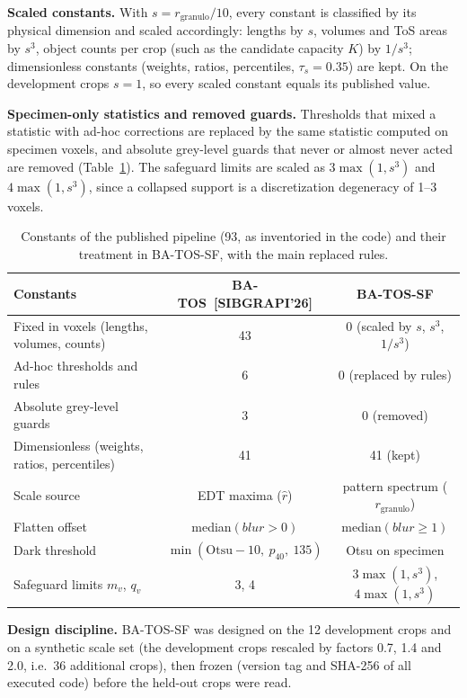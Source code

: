 \documentclass[12pt]{article}
\newcommand{\SIB}{BA-TOS~[SIBGRAPI'26]}
\newcommand{\SF}{BA-TOS-SF}
\newcommand{\rg}{r_{\mathrm{granulo}}}
\begin{document}
\textbf{Scaled constants.} With $s = \rg/10$, every constant is classified by its physical dimension and scaled
accordingly: lengths by $s$, volumes and ToS areas by $s^3$, object counts per crop (such as the candidate
capacity $K$) by $1/s^3$; dimensionless constants (weights, ratios, percentiles, $\tau_s = 0.35$) are kept. On the
development crops $s=1$, so every scaled constant equals its published value.

\textbf{Specimen-only statistics and removed guards.} Thresholds that mixed a statistic with ad-hoc corrections are
replaced by the same statistic computed on specimen voxels, and absolute grey-level guards that never or almost never
acted are removed (Table~\ref{tab:constants}). The safeguard limits are scaled as $3\max(1,s^3)$ and $4\max(1,s^3)$,
since a collapsed support is a discretization degeneracy of 1--3 voxels.

\begin{table}[t]
\centering
\caption{Constants of the published pipeline (93, as inventoried in the code) and their treatment in \SF, with the
main replaced rules.}
\label{tab:constants}
\small
\begin{tabular}{p{5.0cm}cc}
\toprule
Constants & \SIB & \SF \\
\midrule
Fixed in voxels (lengths, volumes, counts) & 43 & 0 (scaled by $s$, $s^3$, $1/s^3$) \\
Ad-hoc thresholds and rules & 6 & 0 (replaced by rules) \\
Absolute grey-level guards & 3 & 0 (removed) \\
Dimensionless (weights, ratios, percentiles) & 41 & 41 (kept) \\
\midrule
Scale source & EDT maxima ($\hat r$) & pattern spectrum ($\rg$) \\
Flatten offset & median$(\mathit{blur} > 0)$ & median$(\mathit{blur} \ge 1)$ \\
Dark threshold & $\min(\mathrm{Otsu}-10,\ p_{40},\ 135)$ & Otsu on specimen \\
Safeguard limits $m_v$, $q_v$ & 3, 4 & $3\max(1,s^3)$, $4\max(1,s^3)$ \\
\bottomrule
\end{tabular}
\end{table}

\textbf{Design discipline.} \SF{} was designed on the 12 development crops and on a synthetic scale set (the
development crops rescaled by factors 0.7, 1.4 and 2.0, i.e.\ 36 additional crops), then frozen (version tag and
SHA-256 of all executed code) before the held-out crops were read.
\end{document}
